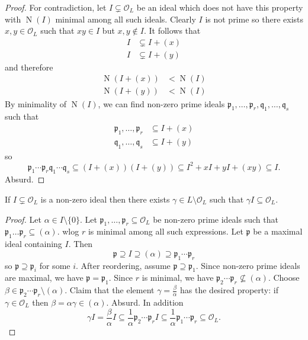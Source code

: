 \documentclass[a4paper]{article}
\renewcommand*{\O}{\mathcal{O}}
\DeclareMathOperator{\n}{N}
\begin{document}
\begin{proof}
  For contradiction, let \(I \subsetneq \O_L\) be an ideal which does not have this property with \(\n(I)\) minimal among all such ideals. Clearly \(I\) is not prime so there exists \(x, y \in \O_L\) such that \(xy \in I\) but \(x, y \notin I\). It follows that
  \begin{align*}
    I &\subsetneq I + (x) \\
    I &\subsetneq I + (y)
  \end{align*}
  and therefore
  \begin{align*}
    \n(I + (x)) &< \n(I) \\
    \n(I + (y)) &< \n(I)
  \end{align*}
  By minimality of \(\n(I)\), we can find non-zero prime ideals \(\mathfrak{p}_1, \dots, \mathfrak{p}_r, \mathfrak{q}_1, \dots, \mathfrak{q}_s\) such that
  \begin{align*}
    \mathfrak{p}_1, \dots, \mathfrak{p}_r &\subseteq I + (x) \\
    \mathfrak{q}_1, \dots, \mathfrak{q}_s &\subseteq I + (y)
  \end{align*}
  so
  \[
    \mathfrak{p}_1 \cdots \mathfrak{p}_r\mathfrak{q}_1 \cdots \mathfrak{q}_s \subseteq (I + (x))(I + (y)) \subseteq I^2 + xI + yI + (xy) \subseteq I.
  \]
  Absurd.
\end{proof}

\begin{lemma}
  If \(I \subsetneq \O_L\) is a non-zero ideal then there exists \(\gamma \in L \setminus \O_L\) such that \(\gamma I \subseteq \O_L\).
\end{lemma}

\begin{proof}
  Let \(\alpha \in I \setminus \{0\}\). Let \(\mathfrak{p}_1, \dots, \mathfrak{p}_r \subseteq \O_L\) be non-zero prime ideals such that \(\mathfrak{p}_1 \dots \mathfrak{p}_r \subseteq (\alpha)\). wlog \(r\) is minimal among all such expressions. Let \(\mathfrak{p}\) be a maximal ideal containing \(I\). Then
  \[
    \mathfrak{p} \supseteq I \supseteq (\alpha) \supseteq \mathfrak{p}_1 \cdots \mathfrak{p}_r
  \]
  so \(\mathfrak{p} \supseteq \mathfrak{p}_i\) for some \(i\). After reordering, assume \(\mathfrak{p} \supseteq \mathfrak{p}_1\). Since non-zero prime ideals are maximal, we have \(\mathfrak{p} = \mathfrak{p}_1\). Since \(r\) is minimal, we have \(\mathfrak{p}_2 \cdots \mathfrak{p}_r \nsubseteq (\alpha)\). Choose \(\beta \in \mathfrak{p}_2 \cdots \mathfrak{p}_r \setminus (\alpha)\). Claim that the element \(\gamma = \frac{\beta}{\alpha}\) has the desired property: if \(\gamma \in \O_L\) then \(\beta = \alpha\gamma \in (\alpha)\). Absurd. In addition
  \[
    \gamma I = \frac{\beta}{\alpha}I \subseteq \frac{1}{\alpha} \mathfrak{p}_2 \cdots \mathfrak{p}_r I \subseteq \frac{1}{\alpha} \mathfrak{p}_1\cdots \mathfrak{p}_r \subseteq \O_L.
  \]
\end{proof}
\end{document}
